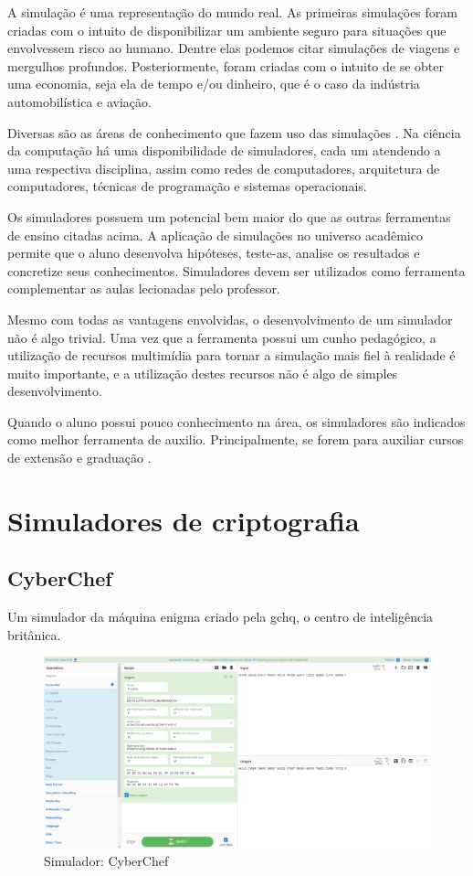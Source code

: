 A simulação é uma representação do mundo real. As primeiras simulações foram criadas com o intuito de disponibilizar um ambiente seguro para situações que envolvessem risco ao humano. Dentre elas podemos citar simulações de viagens e mergulhos profundos. Posteriormente, foram criadas com o intuito de se obter uma economia, seja ela de tempo e/ou dinheiro, que é o caso da indústria automobilística e aviação.

Diversas são as áreas de conhecimento que fazem uso das simulações \cite{banks09}. Na ciência da computação há uma disponibilidade de simuladores, cada um atendendo a uma respectiva disciplina, assim como redes de computadores, arquitetura de computadores, técnicas de programação e sistemas operacionais.

Os simuladores possuem um potencial bem maior do que as outras ferramentas de ensino citadas acima. A aplicação de simulações no universo acadêmico permite que o aluno desenvolva hipóteses, teste-as, analise os resultados e concretize seus conhecimentos. Simuladores devem ser utilizados como ferramenta complementar as aulas lecionadas pelo professor.

Mesmo com todas as vantagens envolvidas, o desenvolvimento de um simulador não é algo trivial. Uma vez que a ferramenta possui um cunho pedagógico, a utilização de recursos multimídia para tornar a simulação mais fiel à realidade é muito importante, e a utilização destes recursos não é algo de simples desenvolvimento.

Quando o aluno possui pouco conhecimento na área, os simuladores são indicados como melhor ferramenta de auxilio. Principalmente, se forem para auxiliar cursos de extensão e graduação \cite{maia01} \cite{maia03}. 

\section{Simuladores de criptografia}
\label{sec:simuladorescriptografia}

\subsection{CyberChef}
Um simulador da máquina enigma criado pela \acrfull{gchq}, o centro de inteligência britânica.

\begin{figure}[H]
    \centering
    \caption{Simulador: CyberChef}
    \includegraphics[width=1\linewidth]{Simuladores/CyberChef_Enigma.png}
\end{figure}

